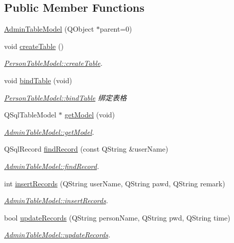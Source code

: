 \subsection*{Public Member Functions}
\begin{DoxyCompactItemize}
\item 
\mbox{\hyperlink{class_admin_table_model_a19a985b406a9cc0a7d9c270c7e22e43e}{Admin\+Table\+Model}} (Q\+Object $\ast$parent=0)
\item 
void \mbox{\hyperlink{class_admin_table_model_a221d30635e1a6f55fcfbf241108636df}{create\+Table}} ()
\begin{DoxyCompactList}\small\item\em \mbox{\hyperlink{class_person_table_model_a121018cb2905e38572a05c457e9fda35}{Person\+Table\+Model\+::create\+Table}}. \end{DoxyCompactList}\item 
void \mbox{\hyperlink{class_admin_table_model_a8f24c9bdafcd7d3b4f668b8893d64b59}{bind\+Table}} (void)
\begin{DoxyCompactList}\small\item\em \mbox{\hyperlink{class_person_table_model_a4abbde77bb6256c11d464d59c77878e4}{Person\+Table\+Model\+::bind\+Table}} 绑定表格 \end{DoxyCompactList}\item 
Q\+Sql\+Table\+Model $\ast$ \mbox{\hyperlink{class_admin_table_model_a67350532cce04df05f02baf1148d957b}{get\+Model}} (void)
\begin{DoxyCompactList}\small\item\em \mbox{\hyperlink{class_admin_table_model_a67350532cce04df05f02baf1148d957b}{Admin\+Table\+Model\+::get\+Model}}. \end{DoxyCompactList}\item 
Q\+Sql\+Record \mbox{\hyperlink{class_admin_table_model_a951c5e298d36e8451a13c63711933b5e}{find\+Record}} (const Q\+String \&user\+Name)
\begin{DoxyCompactList}\small\item\em \mbox{\hyperlink{class_admin_table_model_a951c5e298d36e8451a13c63711933b5e}{Admin\+Table\+Model\+::find\+Record}}. \end{DoxyCompactList}\item 
int \mbox{\hyperlink{class_admin_table_model_a42e5ffcf891cda90e417db09ba12bce7}{insert\+Records}} (Q\+String user\+Name, Q\+String pawd, Q\+String remark)
\begin{DoxyCompactList}\small\item\em \mbox{\hyperlink{class_admin_table_model_a42e5ffcf891cda90e417db09ba12bce7}{Admin\+Table\+Model\+::insert\+Records}}. \end{DoxyCompactList}\item 
bool \mbox{\hyperlink{class_admin_table_model_a5d8e20b2b978cf098ea4f2df9e8c32ad}{update\+Records}} (Q\+String person\+Name, Q\+String pwd, Q\+String time)
\begin{DoxyCompactList}\small\item\em \mbox{\hyperlink{class_admin_table_model_a5d8e20b2b978cf098ea4f2df9e8c32ad}{Admin\+Table\+Model\+::update\+Records}}. \end{DoxyCompactList}\end{DoxyCompactItemize}
